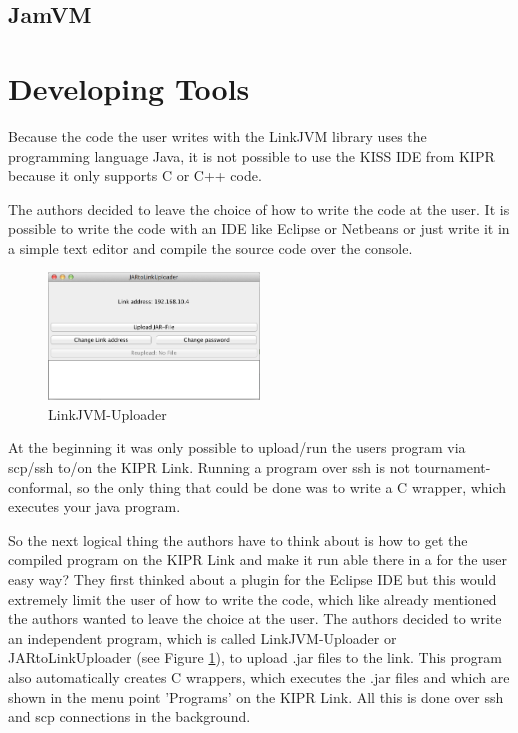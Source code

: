 \documentclass{juniorjournal}
\begin{document}
\subsection{JamVM}

\section{Developing Tools}
Because the code the user writes with the LinkJVM library uses the programming 
language Java, it is not possible to use the KISS IDE from KIPR because it only 
supports C or C++ code.

The authors decided to leave the choice of how to write the code at the user. It 
is possible to write the code with an IDE like Eclipse or Netbeans or just write 
it in a simple text editor and compile the source code over the console.

\begin{figure}[H]
\centering
\includegraphics[width=0.5\textwidth]{images/linkjvm_uploader.jpg}
\caption{LinkJVM-Uploader}
\label{fig:linkjvm_uploader}
\end{figure}

At the beginning it was only possible to upload/run the users program via scp/ssh to/on the KIPR Link.
Running a program over ssh is not tournament-conformal, so the only thing that could be done 
was to write a C wrapper, which executes your java program.

So the next logical thing the authors have to think about is how to get the compiled 
program on the KIPR Link and make it run able there in a for the user easy way?
They first thinked about a plugin for the Eclipse IDE but this would extremely 
limit the user of how to write the code, which like already mentioned the 
authors wanted to leave the choice at the user.
The authors decided to write an independent program, which is called 
LinkJVM-Uploader or JARtoLinkUploader (see Figure \ref{fig:linkjvm_uploader}), 
to upload .jar files to the link. This program also automatically creates C 
wrappers, which executes the .jar files and which are shown in the menu point 
'Programs' on the KIPR Link. All this is done over ssh and scp connections in 
the background.

\begin{thebibliography}{500} %

\end{thebibliography}
\end{document}
